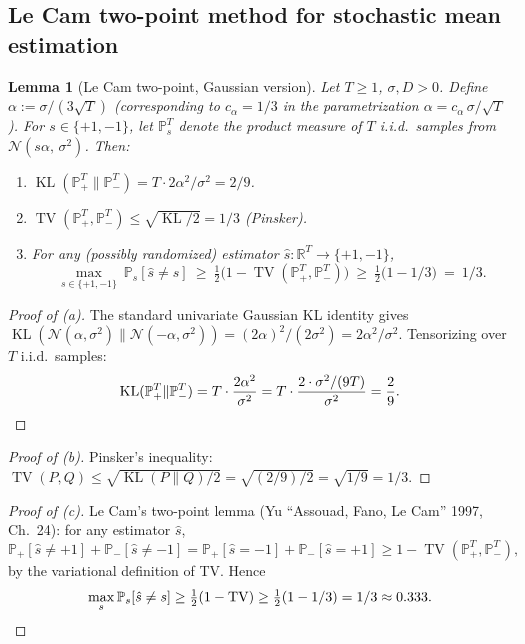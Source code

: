 \documentclass[11pt]{article}
\newtheorem{lemma}[theorem]{Lemma}
\theoremstyle{definition}
\theoremstyle{remark}
\DeclareMathOperator{\KL}{KL}
\DeclareMathOperator{\TV}{TV}
\begin{document}
\subsection{Le Cam two-point method for stochastic mean estimation}
\label{sec:lecam}

\begin{lemma}[Le Cam two-point, Gaussian version]
\label{lem:lecam}
Let $T \geq 1$, $\sigma, D > 0$. Define $\alpha := \sigma/(3\sqrt T)$ (corresponding to $c_\alpha = 1/3$ in the parametrization $\alpha = c_\alpha\,\sigma/\sqrt T$). For $s \in \{+1, -1\}$, let $\mathbb{P}_s^T$ denote the product measure of $T$ i.i.d.\ samples from $\mathcal{N}(s\alpha,\,\sigma^2)$. Then:
\begin{enumerate}
\item[(a)] $\KL(\mathbb{P}_+^T \| \mathbb{P}_-^T) = T \cdot 2\alpha^2/\sigma^2 = 2/9$.
\item[(b)] $\TV(\mathbb{P}_+^T, \mathbb{P}_-^T) \leq \sqrt{\KL/2} = 1/3$ (Pinsker).
\item[(c)] For any (possibly randomized) estimator $\hat s : \mathbb{R}^T \to \{+1, -1\}$,
\[
  \max_{s \in \{+1,-1\}}\ \mathbb{P}_s[\hat s \neq s]\ \geq\ \tfrac{1}{2}\bigl(1 - \TV(\mathbb{P}_+^T, \mathbb{P}_-^T)\bigr)\ \geq\ \tfrac{1}{2}\bigl(1 - 1/3\bigr)\ =\ 1/3.
\]
\end{enumerate}
\end{lemma}

\begin{proof}[Proof of (a)]
The standard univariate Gaussian KL identity gives $\KL(\mathcal{N}(\alpha, \sigma^2) \| \mathcal{N}(-\alpha, \sigma^2)) = (2\alpha)^2/(2\sigma^2) = 2\alpha^2/\sigma^2$. Tensorizing over $T$ i.i.d.\ samples:
\[
  \KL(\mathbb{P}_+^T \| \mathbb{P}_-^T) = T \cdot \frac{2\alpha^2}{\sigma^2} = T \cdot \frac{2 \cdot \sigma^2/(9T)}{\sigma^2} = \frac{2}{9}. \qedhere
\]
\end{proof}

\begin{proof}[Proof of (b)]
Pinsker's inequality: $\TV(P, Q) \leq \sqrt{\KL(P \| Q)/2} = \sqrt{(2/9)/2} = \sqrt{1/9} = 1/3$.
\end{proof}

\begin{proof}[Proof of (c)]
Le Cam's two-point lemma (Yu ``Assouad, Fano, Le Cam'' 1997, Ch.~24): for any estimator $\hat s$,
\[
  \mathbb{P}_+[\hat s \neq +1] + \mathbb{P}_-[\hat s \neq -1] = \mathbb{P}_+[\hat s = -1] + \mathbb{P}_-[\hat s = +1] \geq 1 - \TV(\mathbb{P}_+^T, \mathbb{P}_-^T),
\]
by the variational definition of TV. Hence
\[
  \max_{s}\mathbb{P}_s[\hat s \neq s] \geq \tfrac{1}{2}(1 - \TV) \geq \tfrac{1}{2}(1 - 1/3) = 1/3 \approx 0.333. \qedhere
\]
\end{proof}
\end{document}
